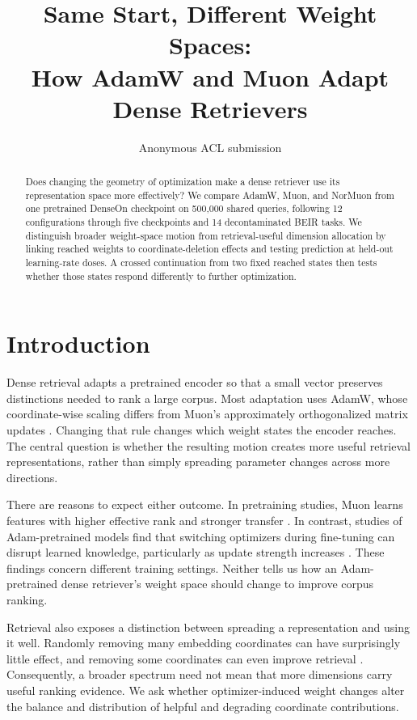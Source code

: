 \documentclass[11pt]{article}
\title{Same Start, Different Weight Spaces:\\
How AdamW and Muon Adapt Dense Retrievers}
\author{Anonymous ACL submission}
\begin{document}
\raggedbottom
\maketitle

\begin{abstract}
Does changing the geometry of optimization make a dense retriever use its representation space
more effectively? We compare AdamW, Muon, and NorMuon from one pretrained DenseOn checkpoint on
500,000 shared queries, following 12 configurations through five checkpoints and 14 decontaminated
BEIR tasks. \CorrectedAbstractFinding{} We distinguish broader weight-space motion from
retrieval-useful dimension allocation by linking reached weights to coordinate-deletion effects
and testing prediction at held-out learning-rate doses. A crossed continuation from two fixed
reached states then tests whether those states respond differently to further optimization.
\StateOperatorAbstractFinding{}
\end{abstract}

\section{Introduction}

Dense retrieval adapts a pretrained encoder so that a small vector preserves distinctions needed
to rank a large corpus. Most adaptation uses AdamW, whose coordinate-wise scaling differs from
Muon's approximately orthogonalized matrix updates
\citep{loshchilov2019decoupled,liu2025muon}. Changing that rule changes which weight states the
encoder reaches. The central question is whether the resulting motion creates more useful
retrieval representations, rather than simply spreading parameter changes across more directions.

There are reasons to expect either outcome. In pretraining studies, Muon learns features with
higher effective rank and stronger transfer \citep{ruan2026features}. In contrast, studies of
Adam-pretrained models find that switching optimizers during fine-tuning can disrupt learned
knowledge, particularly as update strength increases \citep{qu2026finetune,liu2026consistency}.
These findings concern different training settings. Neither tells us how an Adam-pretrained dense
retriever's weight space should change to improve corpus ranking.

Retrieval also exposes a distinction between spreading a representation and using it well.
Randomly removing many embedding coordinates can have surprisingly little effect, and removing
some coordinates can even improve retrieval \citep{takeshita2025dimensions}. Consequently, a
broader spectrum need not mean that more dimensions carry useful ranking evidence. We ask whether
optimizer-induced weight changes alter the balance and distribution of helpful and degrading
coordinate contributions.
\end{document}
